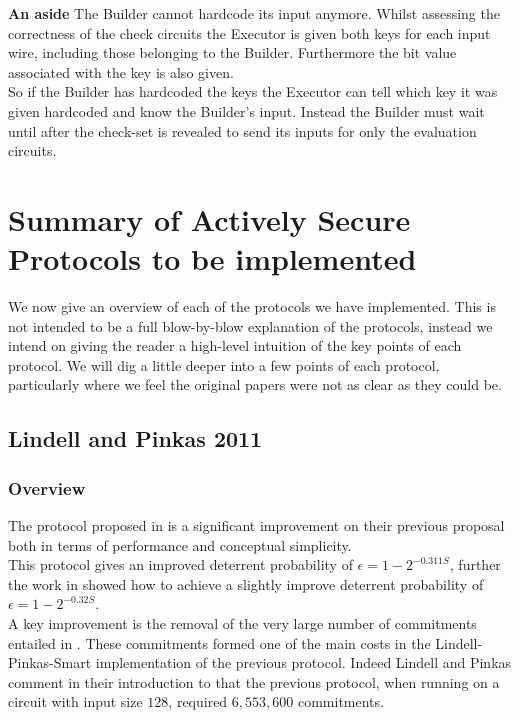 \documentclass[ %
                    author={Nicholas Tutte},
                supervisor={Prof. Nigel Smart},
                    degree={MEng},
                     title={Secure Two Party Computation},
                  subtitle={A practical comparison of recent protocols},
                      type={Research - GG1K},
                      year={2015} ]{dissertation}
\begin{document}
				\noindent \textbf{An aside} The Builder cannot hardcode its input anymore. Whilst assessing the correctness of the check circuits the Executor is given both keys for each input wire, including those belonging to the Builder. Furthermore the bit value associated with the key is also given.\\

				So if the Builder has hardcoded the keys the Executor can tell which key it was given hardcoded and know the Builder's input. Instead the Builder must wait until after the check-set is revealed to send its inputs for only the evaluation circuits.

	\chapter{Summary of Actively Secure Protocols to be implemented} \label{sec:Protocols}
		We now give an overview of each of the protocols we have implemented. This is not intended to be a full blow-by-blow explanation of the protocols, instead we intend on giving the reader a high-level intuition of the key points of each protocol. We will dig a little deeper into a few points of each protocol, particularly where we feel the original papers were not as clear as they could be.

		\section{Lindell and Pinkas 2011}
			\subsection{Overview}
				The protocol proposed in \cite{LindellAndPinkas2011} is a significant improvement on their previous proposal \cite{LindellAndPinkas2007} both in terms of performance and conceptual simplicity.\\

				This protocol gives an improved deterrent probability of $\epsilon = 1 - 2^{-0.311 S}$, further the work in \cite{ShelatAndShen} showed how to achieve a slightly improve deterrent probability of $\epsilon = 1 - 2^{-0.32 S}$.\\

				A key improvement is the removal of the very large number of commitments entailed in \cite{LindellAndPinkas2007}. These commitments formed one of the main costs in the Lindell-Pinkas-Smart\cite{LindellPinkasSmart2008} implementation of the previous protocol. Indeed Lindell and Pinkas comment in their introduction to \cite{LindellAndPinkas2011} that the previous protocol, when running on a circuit with input size $128$, required $6,553,600$ commitments.\\
\end{document}
